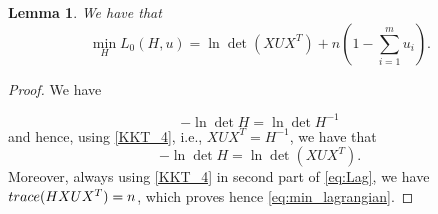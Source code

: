 \documentclass[10pt,a4paper]{amsart}
\newtheorem{lemma}{Lemma}
\begin{document}
\begin{lemma}\label{lem:min+lag}
	We have that
	\begin{equation}\label{eq:min_lagrangian}
		\min_{H} L_0(H,u)=\ln \det(XUX^T) +n(1-\sum_{i=1}^mu_i).
	\end{equation}
\end{lemma}

\begin{proof}
	
	We have
	
	\begin{equation*}
		 -\ln\det H=\ln\det H^{-1}%
	\end{equation*}
	and hence,  using \eqref{KKT_4}, i.e., $XUX^T=H^{-1}$, we have that $$-  \ln\det H =  \ln \det (XUX^T).$$
	Moreover, always using \eqref{KKT_4} in second part of \eqref{eq:Lag}, we have ${\rm{trace}}(HXUX^T)=n$, which proves hence \eqref{eq:min_lagrangian}. 
\end{proof}
\end{document}

